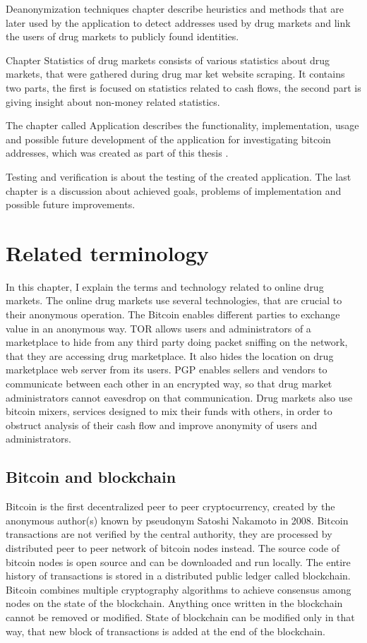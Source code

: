 \documentclass[
  digital, %
  table,   %
  lof,     %
  lot,     %
  oneside
]{fithesis3}
\begin{document}
Deanonymization techniques chapter describe heuristics and methods that are later used by the application to detect 
addresses used by drug markets and link the users of drug markets to publicly found identities.

Chapter Statistics of drug markets consists of various statistics about drug markets, that were gathered during drug mar
ket website scraping.
It contains two parts, the first is focused on statistics related to cash flows, the second part is giving insight about
 non-money related statistics.

The chapter called Application describes the functionality, implementation, usage and 
possible future development of the application for investigating bitcoin addresses, which was created as part of this thesis
.

Testing and verification is about the testing of the created application.
The last chapter is a discussion about achieved goals, problems of implementation and possible future improvements.

\chapter{Related terminology}

In this chapter, I explain the terms and technology related to online drug markets.
The online drug markets use several technologies, that are crucial to their anonymous operation.
The Bitcoin enables different parties to exchange value in an anonymous way.
TOR allows users and administrators of a marketplace to hide from any third party doing packet sniffing on the network,
that they are accessing drug marketplace. It also hides the location on drug marketplace web server from its users.
PGP enables sellers and vendors to communicate between each other in an encrypted way,
so that drug market administrators cannot eavesdrop on that communication.
Drug markets also use bitcoin mixers, services designed to mix their funds with others, in order to obstruct
analysis of their cash flow and improve anonymity of users and administrators.

\section{Bitcoin and blockchain}

Bitcoin \parencite{nakamoto2008bitcoin} is the first decentralized peer to peer cryptocurrency,
created by the anonymous author(s) known by pseudonym Satoshi Nakamoto in 2008.
Bitcoin transactions are not verified by the central authority, they are processed by distributed peer to peer network of bitcoin nodes instead. 
The source code of bitcoin nodes is open source and can be downloaded and run locally. 
The entire history of transactions is stored in a distributed public ledger called blockchain.
Bitcoin combines multiple cryptography algorithms to achieve consensus among nodes
on the state of the blockchain. Anything once written in the blockchain
cannot be removed or modified. State of blockchain can be modified only in that way, that new
block of transactions is added at the end of the blockchain.
\end{document}
